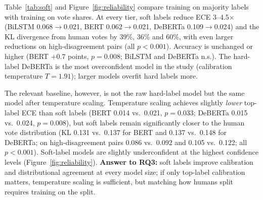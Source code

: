 \documentclass[11pt]{article}
\newcommand{\pa}{p_{A}}
\begin{document}
\begin{table}[t]
\centering
\small
\setlength{\tabcolsep}{4pt}
\caption{SHP test set (18,406 pairs). Hard: trained on majority labels; hard + $T$: the same model after temperature scaling; soft: trained on vote shares. HD: the 3,744 high-disagreement pairs ($0.4<\pa<0.6$). KL: divergence from the human vote share.}
\label{tab:soft}
\end{table}

Table~\ref{tab:soft} and Figure~\ref{fig:reliability} compare training on majority labels with training on vote shares. At every tier, soft labels reduce ECE 3--4.5$\times$ (BiLSTM 0.068$\to$0.021, BERT 0.062$\to$0.021, DeBERTa 0.109$\to$0.024) and the KL divergence from human votes by 39\%, 36\% and 60\%, with even larger reductions on high-disagreement pairs (all $p<0.001$). Accuracy is unchanged or higher (BERT $+0.7$ points, $p=0.008$; BiLSTM and DeBERTa n.s.). The hard-label DeBERTa is the most overconfident model in the study (calibration temperature $T=1.91$); larger models overfit hard labels more.

The relevant baseline, however, is not the raw hard-label model but the same model after temperature scaling. Temperature scaling achieves slightly \emph{lower} top-label ECE than soft labels (BERT 0.014 vs.\ 0.021, $p=0.033$; DeBERTa 0.015 vs.\ 0.024, $p=0.008$), but soft labels remain significantly closer to the human vote distribution (KL 0.131 vs.\ 0.137 for BERT and 0.137 vs.\ 0.148 for DeBERTa; on high-disagreement pairs 0.086 vs.\ 0.092 and 0.105 vs.\ 0.122; all $p<0.001$). Soft-label models are slightly underconfident at the highest confidence levels (Figure~\ref{fig:reliability}). \textbf{Answer to RQ3:} soft labels improve calibration and distributional agreement at every model size; if only top-label calibration matters, temperature scaling is sufficient, but matching how humans split requires training on the split.
\end{document}
